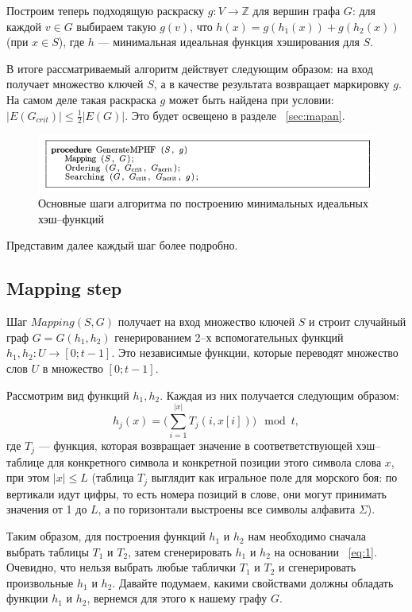 \documentclass[specialist,
               substylefile = spbu.rtx,
               subf,href,colorlinks=true, 12pt]{disser}
\begin{document}
Построим теперь подходящую раскраску $g : V \longrightarrow \mathbb{Z}$ для вершин графа $G$: для каждой $v \in G$ выбираем такую $g(v)$, что $h(x) = g(h_1(x)) + g(h_2(x))$ (при $x \in S$), где $h$ --- минимальная идеальная функция хэширования для $S$.

В итоге рассматриваемый алгоритм действует следующим образом: на вход получает множество ключей $S$, а в качестве результата возвращает маркировку $g$. На самом деле такая раскраска $g$ может быть найдена при условии: $|E(G_{crit})| \leq \frac{1}{2}|E(G)|$. Это будет освещено в разделе ~\ref{sec:mapan}.

\begin{figure}[h]
\begin{center}
\includegraphics[scale=0.5]{imgs/proc.jpg}
\caption{Основные шаги алгоритма по построению минимальных идеальных хэш--функций}
\end{center}
\end{figure}
Представим далее каждый шаг более подробно.

\subsection{Mapping step}

Шаг $Mapping (S, G)$ получает на вход множество ключей $S$ и строит случайный граф $G = G(h_1, h_2)$  генерированием 2--х вспомогательных функций $h_1, h_2 : U \longrightarrow [0;t - 1]$. Это независимые функции, которые переводят множество слов $U$ в множество $[0; t - 1]$.

Рассмотрим вид функций $h_1, h_2$. Каждая из них получается следующим образом:
%
\begin{equation}\label{eq:1}
h_j(x) = \Big ( \sum \limits_{i = 1}^{|x|}T_j(i,x[i])\Big)\mod t,
\end{equation}
%
где $T_j$ --- функция, которая возвращает значение в соответветствующей хэш--таблице для конкретного символа и конкретной позиции этого символа слова $x$, при этом $|x| \leq L$ (таблица $T_j$ выглядит как игральное поле для морского боя: по вертикали идут цифры, то есть номера позиций в слове, они могут принимать значения от 1 до $L$, а по горизонтали выстроены все символы алфавита $\Sigma$).

Таким образом, для построения функций $h_1$ и $h_2$ нам необходимо сначала выбрать таблицы $T_1$ и $T_2$, затем сгенерировать $h_1$ и $h_2$ на основании ~\ref{eq:1}. Очевидно, что нельзя выбрать любые таблички $T_1$ и $T_2$ и сгенерировать произвольные $h_1$ и $h_2$. Давайте подумаем, какими свойствами должны обладать функции $h_1$ и $h_2$, вернемся для этого к нашему графу $G$.
\end{document}
